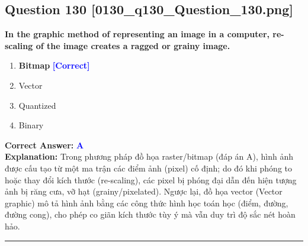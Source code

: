 \documentclass[11pt,a4paper]{article}
\begin{document}
\begin{minipage}{\textwidth}
\subsection*{Question 130 \quad \footnotesize{[0130\_q130\_Question\_130.png]}}
\noindent \textbf{In the graphic method of representing an image in a computer, re-scaling of the image creates a ragged or grainy image.}

\begin{enumerate}[label=\Alph*.]
    \item \textbf{Bitmap} \hfill \textcolor{blue}{\textbf{[Correct]}}
    \item Vector
    \item Quantized
    \item Binary
\end{enumerate}

\noindent \textbf{Correct Answer:} \textcolor{blue}{\textbf{A}} \\[2pt]
\noindent \textbf{Explanation:} Trong phương pháp đồ họa raster/bitmap (đáp án A), hình ảnh được cấu tạo từ một ma trận các điểm ảnh (pixel) cố định; do đó khi phóng to hoặc thay đổi kích thước (re-scaling), các pixel bị phóng đại dẫn đến hiện tượng ảnh bị răng cưa, vỡ hạt (grainy/pixelated). Ngược lại, đồ họa vector (Vector graphic) mô tả hình ảnh bằng các công thức hình học toán học (điểm, đường, đường cong), cho phép co giãn kích thước tùy ý mà vẫn duy trì độ sắc nét hoàn hảo.

\par\vspace{0.3cm}
\hrule
\vspace{0.3cm}
\end{minipage}
\end{document}
